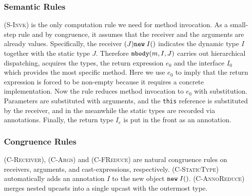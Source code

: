 \subsubsection{Semantic Rules} \textsc{(S-Invk)} is the only computation rule we need for method invocation.
As a small-step rule and by congruence, it assumes that the receiver and the arguments are already values.
Specifically, the receiver $(J)\texttt{new} \; I()$ indicates the dynamic type $I$
together with the static type $J$. Therefore $\texttt{mbody}(m, I, J)$ carries out hierarchical dispatching, acquires
the types, the return expression $e_0$ and the interface $I_0$ which provides the most specific method.
Here we use $e_0$ to imply that the return expression is forced to be non-empty because it requires a concrete implementation. Now the
rule reduces method invocation to $e_0$ with substitution.
Parameters are substituted with arguments, and the \lstinline|this| reference is substituted by the receiver,
and in the meanwhile the static types are recorded via annotations. Finally, the return type $I_e$ is put in the front as an annotation.
\subsubsection{Congruence Rules} \textsc{(C-Receiver)}, \textsc{(C-Args)} and \textsc{(C-FReduce)} are natural congruence rules
on receivers, arguments, and cast-expressions, respectively. \textsc{(C-StaticType)} automatically adds an annotation $I$ to the new
object $\texttt{new} \; I()$. \textsc{(C-AnnoReduce)} merges nested upcasts into a single upcast with the outermost type.



\begin{comment}
\paragraph{Example} In contrast with the counter-example in Section~\ref{subsec:typingrules}, it is better to understand semantics by
well-compiled examples. Here we abstract a variant of the \lstinline|DrawableDeck| example:

\vspace{3pt}\begin{lstlisting}
interface Void       {}
interface JFrame     {}
interface Deck       { Void draw() override Deck { return new Void(); } }
interface Drawable { JFrame draw() override Drawable; }
interface DrawableDeck extends Drawable, Deck {
  JFrame draw() override Drawable {
    return new JFrame();
  }
}

((Drawable) new DrawableDeck()).draw()
\end{lstlisting}\vspace{3pt}
We put \lstinline|Drawable.draw| as an abstract method instead, but hierarchically override it in \lstinline|DrawableDeck|.
By typing rules, the code is well-compiled. And during runtime,
\begin{align*}
	& ((Drawable) new DrawableDeck()).draw() \\
\rightarrow & (JFrame) new JFrame()
\end{align*}
\end{comment}